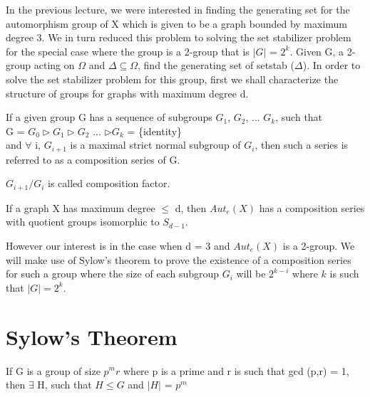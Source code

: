 
In the previous lecture, we were interested in finding the generating set for
the automorphism group of X which is given to be a graph bounded by maximum
degree 3. We in turn reduced this problem to solving the set stabilizer
problem for the special case where the group is a 2-group that is $|G|$ =
$2^{k}$.  Given G, a 2-group acting on $\Omega$ and $\Delta \subseteq \Omega$,
find the generating set of setstab ($\Delta$). In order to solve the set
stabilizer problem for this group, first we shall characterize the structure of
groups for graphs with maximum degree d.

\begin{definition}

If a given group G has a sequence of subgroups $G_{1}$, $G_{2}$, ... $G_{k}$, such that \\
G = $G_{0} \triangleright G_{1} \triangleright G_{2}$ ... $\triangleright G_{k}$ = \{identity\} \\
and $\forall$ i, $G_{i+1}$ is a maximal strict normal subgroup of $G_{i}$, then such a series is referred to as a composition series of G.

$G_{i+1} / G_{i}$ is called composition factor.
\end{definition}

\begin{claim}
If a graph X has maximum degree $\leq$ d, then $Aut_{e}(X)$ has a composition series with quotient groups isomorphic to $S_{d-1}$.
\end{claim}

However our interest is in the case when d = 3 and $Aut_{e}(X)$ is a 2-group. We will make use of Sylow's theorem to prove the existence of a composition series for such a group where the size of each subgroup $G_{i}$ will be $2^{k - i}$ where $k$ is such that $|G| = 2^{k}$. 

\section{Sylow's Theorem}

\begin{theorem}
If G is a group of size $p^{m}r$ where p is a prime and r is such that gcd (p,r) = 1, then $\exists$ H, such that $H \leqslant G$ and $|H|$ = $p^{m}$
\end{theorem}

